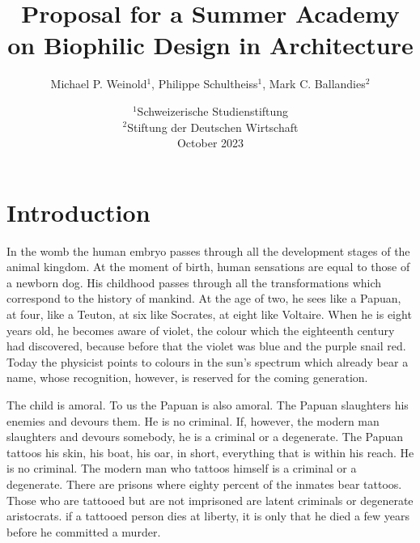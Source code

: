 \documentclass[a4paper]{article}
\title{Proposal for a Summer Academy \protect\\ on Biophilic Design in Architecture}
\author{Michael P. Weinold$^1$, Philippe Schultheiss$^1$, Mark C. Ballandies$^2$}
\date{
    $^1$Schweizerische Studienstiftung \\
    $^2$Stiftung der Deutschen Wirtschaft \\[3mm]
    October 2023
}
\begin{document}


\clearpage

\section*{\centering Introduction}

In the womb the human embryo passes through all the development stages of the animal kingdom. At the moment of birth, human sensations are equal to those of a newborn dog. His childhood passes through all the transformations which correspond to the history of mankind. At the age of two, he sees like a Papuan, at four, like a Teuton, at six like Socrates, at eight like Voltaire. When he is eight years old, he becomes aware of violet, the colour which the eighteenth century had discovered, because before that the violet was blue and the purple snail red. Today the physicist points to colours in the sun’s spectrum which already bear a name, whose recognition, however, is reserved for the coming generation.

The child is amoral. To us the Papuan is also amoral. The Papuan slaughters his enemies and devours them. He is no criminal. If, however, the modern man slaughters and devours somebody, he is a criminal or a degenerate. The Papuan tattoos his skin, his boat, his oar, in short, everything that is within his reach. He is no criminal. The modern man who tattoos himself is a criminal or a degenerate. There are prisons where eighty percent of the inmates bear tattoos. Those who are tattooed but are not imprisoned are latent criminals or degenerate aristocrats. if a tattooed person dies at liberty, it is only that he died a few years before he committed a murder.

\end{document}

